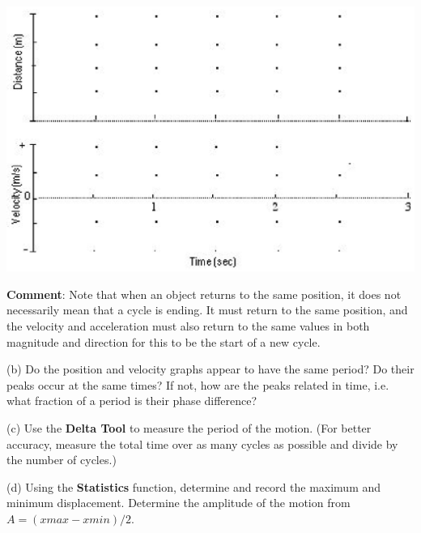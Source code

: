 \vspace{0.3cm}
{\par\centering \includegraphics{periodic_motion/periodic_motion_fig1.eps} \par}
\vspace{0.3cm}

\textbf{Comment}: Note that when an object returns to the same position, it 
does not necessarily mean that a cycle is ending. It must return to the same 
position, and the velocity and acceleration must also return to the same 
values in both magnitude and direction for this to be the start of a new cycle. 


(b) Do the position and velocity graphs appear to have the same period? Do their
peaks occur at the same times? If not, how are the peaks related in time, i.e. 
what fraction of a period is their phase difference?
\vspace{20mm}

(c) Use the \textbf{Delta Tool} to measure the period of the motion. (For
better accuracy, measure the total time over as many cycles as possible and
divide by the number of cycles.)
\vspace{20mm}

(d) Using the \textbf{Statistics} function, determine and record the maximum and minimum 
displacement.  Determine the amplitude of the motion from $A = (xmax - xmin)/2$.
\vspace{30mm}

